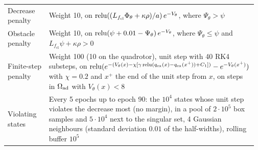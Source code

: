\begin{table}[t]
\begin{tabular}{@{}>{\raggedright\arraybackslash}p{0.16\linewidth}>{\raggedright\arraybackslash}p{0.81\linewidth}@{}}
Decrease penalty & Weight 10, on $\operatorname{relu}((L_{f_{\mathrm{cl}}}\Phi_\theta+\kappa\rho)/a)\,e^{-V_\theta}$, where $\Psi_\theta>\psi$\\
Obstacle penalty & Weight 10, on $\operatorname{relu}(\psi+0.01-\Psi_\theta)\,e^{-V_\theta}$, where $\Psi_\theta\le\psi$ and $L_{f_{\mathrm{cl}}}\psi+\kappa\rho>0$\\
Finite-step penalty & Weight 100 (10 on the quadrotor), unit step with 40 RK4 substeps, on $\operatorname{relu}(e^{-(V_\theta(x)-\chi[\gamma\operatorname{relu}(q_{\mathrm{ex}}(x)-q_{\mathrm{ex}}(x^{+}))+C_1])}-e^{-V_\theta(x^{+})})$ with $\chi=0.2$ and $x^{+}$ the end of the unit step from $x$, on steps in $\Omega_{\mathrm{ad}}$ with $V_\theta(x)<8$\\
Violating states & Every 5 epochs up to epoch 90: the $10^4$ states whose unit step violates the decrease most (no margin), in a pool of $2\cdot10^5$ box samples and $5\cdot10^4$ next to the singular set, 4 Gaussian neighbours (standard deviation $0.01$ of the half-widths), rolling buffer $10^5$\\
\bottomrule
\end{tabular}
\end{table}
